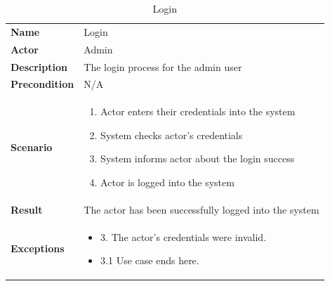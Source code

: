 \begin{table}[ht]
    \caption{Login}
    \begin{tabular}{|L{5cm}|L{10cm}|}
        \toprule
        \textbf{Name}         & Login                                                  \\
        \textbf{Actor}        & Admin                                                  \\
        \textbf{Description}  & The login process for the admin user                   \\
        \textbf{Precondition} & N/A                                                    \\
        \textbf{Scenario} &
        \vspace{-0.75cm}
        \begin{enumerate}
            \setlength\itemsep{-0.5em}
            \item Actor enters their credentials into the system
            \item System checks actor's credentials
            \item System informs actor about the login success
            \item Actor is logged into the system
        \end{enumerate} \\[-0.5cm]
        \textbf{Result}       & The actor has been successfully logged into the system \\
        \textbf{Exceptions} &
        \vspace{-0.75cm}
        \begin{itemize}
            \setlength\itemsep{-0.5em}
            \item 3. The actor's credentials were invalid.
            \item 3.1 Use case ends here.
        \end{itemize} \\
        \bottomrule
    \end{tabular}
    \label{tab:table39}
\end{table}

